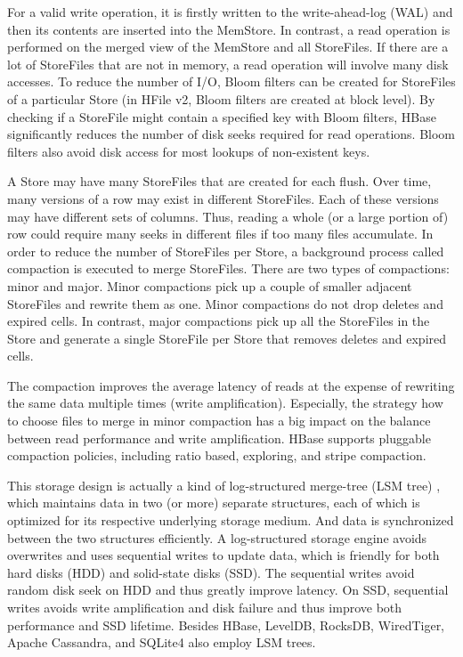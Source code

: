 \documentclass[11pt]{book}
\begin{document}
For a valid write operation, it is firstly written to the write-ahead-log (WAL) and then its contents are inserted into the MemStore. In contrast, a read operation is performed on the merged view of the MemStore and all StoreFiles. If there are a lot of StoreFiles that are not in memory, a read operation will involve many disk accesses. To reduce the number of I/O, Bloom filters \cite{Bloom:1970:STH} can be created for StoreFiles of a particular Store (in HFile v2, Bloom filters are created at block level). By checking if a StoreFile might contain a specified key with Bloom filters, HBase significantly reduces the number of disk seeks required for read operations. Bloom filters also avoid disk access for most lookups of non-existent keys.

A Store may have many StoreFiles that are created for each flush. Over time, many versions of a row may exist in different StoreFiles. Each of these versions may have different sets of columns. Thus, reading a whole (or a large portion of) row could require many seeks in different files if too many files accumulate. In order to reduce the number of StoreFiles per Store, a background process called compaction is executed to merge StoreFiles. There are two types of compactions: minor and major. Minor compactions pick up a couple of smaller adjacent StoreFiles and rewrite them as one. Minor compactions do not drop deletes and expired cells. In contrast, major compactions pick up all the StoreFiles in the Store and generate a single StoreFile per Store that removes deletes and expired cells.

The compaction improves the average latency of reads at the expense of rewriting the same data multiple times (write amplification). Especially, the strategy how to choose files to merge in minor compaction has a big impact on the balance between read performance and write amplification. HBase supports pluggable compaction policies, including ratio based, exploring, and stripe compaction.

This storage design is actually a kind of log-structured merge-tree (LSM tree) \cite{O'Neil96thelog-structured}, which maintains data in two (or more) separate structures, each of which is optimized for its respective underlying storage medium. And data is synchronized between the two structures efficiently. A log-structured storage engine avoids overwrites and uses sequential writes to update data, which is friendly for both hard disks (HDD) and solid-state disks (SSD). The sequential writes avoid random disk seek on HDD and thus greatly improve latency. On SSD, sequential writes avoids write amplification and disk failure and thus improve both performance and SSD lifetime. Besides HBase,  LevelDB, RocksDB, WiredTiger, Apache Cassandra, and SQLite4 also employ LSM trees.
\end{document}
